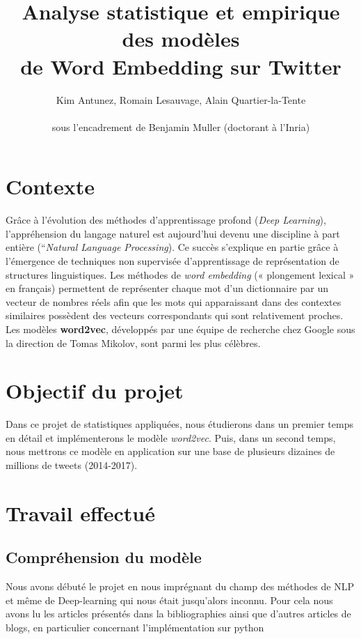 \documentclass[11pt,french,french]{article}
\title{Analyse statistique et empirique des modèles\\
de Word Embedding sur Twitter}
\author{Kim Antunez, Romain Lesauvage, Alain Quartier-la-Tente\\
~\\
sous l'encadrement de Benjamin Muller (doctorant à l'Inria)}
\date{}
\begin{document}
\maketitle


\hypertarget{contexte}{%
\section{Contexte}\label{contexte}}

Grâce à l'évolution des méthodes d'apprentissage profond (\emph{Deep
Learning}), l'appréhension du langage naturel est aujourd'hui devenu une
discipline à part entière (``\emph{Natural Language Processing}). Ce
succès s'explique en partie grâce à l'émergence de techniques non
supervisée d'apprentissage de représentation de structures
linguistiques. Les méthodes de \emph{word embedding} (« plongement
lexical » en français) permettent de représenter chaque mot d'un
dictionnaire par un vecteur de nombres réels afin que les mots qui
apparaissant dans des contextes similaires possèdent des vecteurs
correspondants qui sont relativement proches. Les modèles
\textbf{word2vec}, développés par une équipe de recherche chez Google
sous la direction de Tomas Mikolov, sont parmi les plus célèbres.

\hypertarget{objectif-du-projet}{%
\section{Objectif du projet}\label{objectif-du-projet}}

Dans ce projet de statistiques appliquées, nous étudierons dans un
premier temps en détail et implémenterons le modèle \emph{word2vec}.
Puis, dans un second temps, nous mettrons ce modèle en application sur
une base de plusieurs dizaines de millions de tweets (2014-2017).

\hypertarget{travail-effectuuxe9}{%
\section{Travail effectué}\label{travail-effectuuxe9}}

\hypertarget{compruxe9hension-du-moduxe8le}{%
\subsection{Compréhension du
modèle}\label{compruxe9hension-du-moduxe8le}}

Nous avons débuté le projet en nous imprégnant du champ des méthodes de
NLP et même de Deep-learning qui nous était jusqu'alors inconnu. Pour
cela nous avons lu les articles présentés dans la bibliographies ainsi
que d'autres articles de blogs, en particulier concernant
l'implémentation sur python
\end{document}
